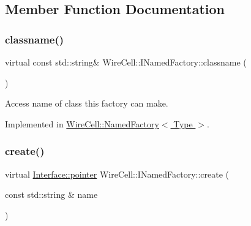 \subsection{Member Function Documentation}
\mbox{\label{class_wire_cell_1_1_i_named_factory_aa66da8d5128e202367b56a0a340dc754}} 
\subsubsection{\texorpdfstring{classname()}{classname()}}
{\footnotesize\ttfamily virtual const std\+::string\& Wire\+Cell\+::\+I\+Named\+Factory\+::classname (\begin{DoxyParamCaption}{ }\end{DoxyParamCaption})\hspace{0.3cm}{\ttfamily [pure virtual]}}



Access name of class this factory can make. 



Implemented in \hyperlink{class_wire_cell_1_1_named_factory_a55b839d7786ecca7b85bcabb7c163daa}{Wire\+Cell\+::\+Named\+Factory$<$ Type $>$}.

\mbox{\label{class_wire_cell_1_1_i_named_factory_aab305aa4c3d65450f97f95b26475d3fe}} 
\subsubsection{\texorpdfstring{create()}{create()}}
{\footnotesize\ttfamily virtual \hyperlink{class_wire_cell_1_1_interface_a09c548fb8266cfa39afb2e74a4615c37}{Interface\+::pointer} Wire\+Cell\+::\+I\+Named\+Factory\+::create (\begin{DoxyParamCaption}\item[{const std\+::string \&}]{name }\end{DoxyParamCaption})\hspace{0.3cm}{\ttfamily [pure virtual]}}



